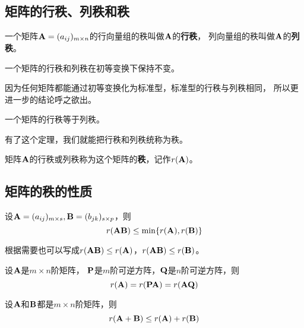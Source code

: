 \subsection{矩阵的行秩、列秩和秩}
\begin{definition}[行秩与列秩]
  一个矩阵$\mathbf{A}=(a_{ij})_{m\times n}$的行向量组的秩叫做$\mathbf{A}$的\textbf{行秩}，
  列向量组的秩叫做$\mathbf{A}$的\textbf{列秩}。
\end{definition}

\begin{theorem}[行秩与列秩的不变性]
  一个矩阵的行秩和列秩在初等变换下保持不变。
\end{theorem}

\begin{remark}
  因为任何矩阵都能通过初等变换化为标准型，标准型的行秩与列秩相同，
  所以更进一步的结论呼之欲出。
\end{remark}

\begin{theorem}[行秩与列秩相等]
  一个矩阵的行秩等于列秩。
\end{theorem}

\begin{remark}
  有了这个定理，我们就能把行秩和列秩统称为秩。
\end{remark}

\begin{theorem}[秩]
  矩阵$\mathbf{A}$的行秩或列秩称为这个矩阵的\textbf{秩}，记作$r(\mathbf{A})$。
\end{theorem}

\subsection{矩阵的秩的性质}
\begin{theorem}
  设$\mathbf{A}=(a_{ij})_{m\times s}, \mathbf{B}=(b_{jk})_{s\times p}$，则
  \[ r(\mathbf{A}\mathbf{B}) \le \min\{ r(\mathbf{A}), r(\mathbf{B}) \} \]
\end{theorem}

\begin{remark}
  根据需要也可以写成$r(\mathbf{A}\mathbf{B}) \le r(\mathbf{A})$，$r(\mathbf{A}\mathbf{B})\le r(\mathbf{B})$。
\end{remark}

\begin{theorem}
  设$\mathbf{A}$是$m\times n$阶矩阵，
  $\mathbf{P}$是$m$阶可逆方阵，$\mathbf{Q}$是$n$阶可逆方阵，则
  \[ r(\mathbf{A}) = r(\mathbf{P}\mathbf{A}) = r(\mathbf{A}\mathbf{Q}) \]
\end{theorem}

\begin{theorem}
  设$\mathbf{A}$和$\mathbf{B}$都是$m\times n$阶矩阵，则
  \[ r(\mathbf{A}+\mathbf{B}) \le r(\mathbf{A}) + r(\mathbf{B}) \]
\end{theorem}

